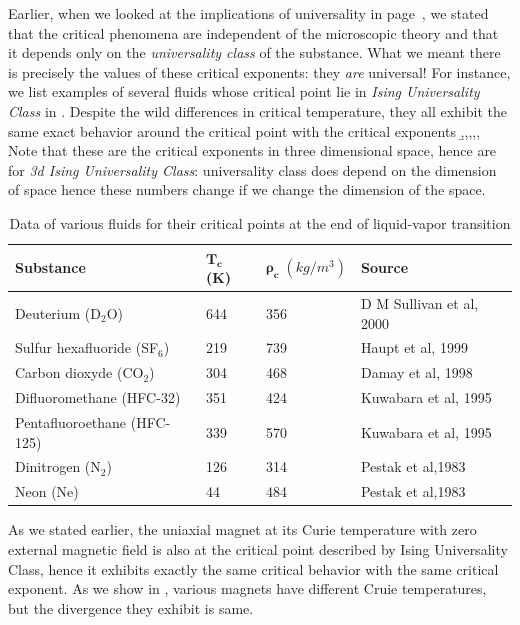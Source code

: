 \documentclass[12pt]{article}
\numberwithin{equation}{section}
\begin{document}
Earlier, when we looked at the implications of universality in page~\pageref{items: implications of universality}, we stated that the critical phenomena are independent of the microscopic theory and that it depends only on the \emph{universality class} of the substance. What we meant there is precisely the values of these critical exponents: they \emph{are} universal! For instance, we list examples of several fluids whose critical point lie in \emph{Ising Universality Class} in \tabref{\ref{table: critical data of various fluids}}. Despite the wild differences in critical temperature, they all exhibit the same exact behavior around the critical point with the critical exponents
\be 
\label{eq: critical exponents for 3d Ising}
\a{}\;,\quad\b{}\;,\quad\g{}\;,\quad\de{}\;,\quad\eta{}\;,\quad\nu{}
\ee 
Note that these are the critical exponents in three dimensional space, hence are for \emph{3d Ising Universality Class}: universality class does depend on the dimension of space hence these numbers change if we change the dimension of the space.

\begin{table}
	\centering
	\caption[Critical data for various fluids]{\label{table: critical data of various fluids}Data of various fluids for their critical points at the end of liquid-vapor transition}
	\begin{tabular}{llll}
		\hline\hline 
		\textbf{Substance} & $\bm{T_c}$ (K)& $\bm{\rho_c} \;(kg/m^3)$ &\textbf{Source}
		\\\hline
		Deuterium (D$_2$O) & 644 & 356   &{D M Sullivan et al, 2000}
		\\
		Sulfur hexafluoride (SF$_6$) & 219  & 739 & {Haupt et al, 1999}
		\\
		Carbon dioxyde (CO$_2$) & 304 & 468 & {Damay et al, 1998}
		\\
		Difluoromethane (HFC-32) & 351 & 424 & {Kuwabara et al, 1995}
		\\
		Pentafluoroethane (HFC-125) &  339 & 570 & {Kuwabara et al, 1995}
		\\
		Dinitrogen (N$_2$) &126& 314&{Pestak et al,1983}
		\\
		Neon (Ne)&44&484&{Pestak et al,1983}
		\\\hline\hline 
	\end{tabular}
\end{table}

As we stated earlier, the uniaxial magnet at its Curie temperature with zero external magnetic field is also at the critical point described by Ising Universality Class, hence it exhibits exactly the same critical behavior with the same critical exponent. As we show in \figref{\ref{fig: curie temperatures}}, various magnets have different Cruie temperatures, but the divergence they exhibit is same.
\end{document}
